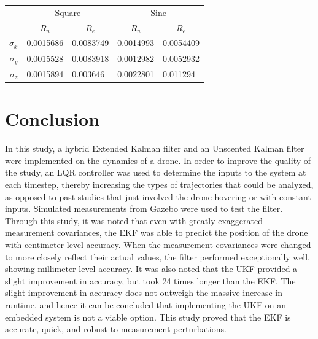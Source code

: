 \documentclass[letterpaper, paper,11pt]{AAS}	%
\begin{document}
\begin{table}[H]
\centering
\begin{tabular}{|r|ll|ll|}
\hline
\multirow{2}{*}{\ } & \multicolumn{2}{c|}{Square} & \multicolumn{2}{c|}{Sine} \\ \cline{2-5} 
 & \multicolumn{1}{c|}{$R_{a}$} & \multicolumn{1}{c|}{$R_{e}$} & \multicolumn{1}{c|}{$R_{a}$} & \multicolumn{1}{c|}{$R_{e}$} \\ \hline
$\sigma_x$ & \multicolumn{1}{l|}{0.0015686} & 0.0083749 & \multicolumn{1}{l|}{0.0014993} & 0.0054409 \\ \hline
$\sigma_y$ & \multicolumn{1}{l|}{0.0015528} & 0.0083918 & \multicolumn{1}{l|}{0.0012982} & 0.0052932 \\ \hline
$\sigma_z$ & \multicolumn{1}{l|}{0.0015894} & 0.003646 & \multicolumn{1}{l|}{0.0022801} & 0.011294 \\ \hline
\end{tabular}
\end{table}

\section{Conclusion}

In this study, a hybrid Extended Kalman filter and an Unscented Kalman filter were implemented on the dynamics of a drone. In order to improve the quality of the study, an LQR controller was used to determine the inputs to the system at each timestep, thereby increasing the types of trajectories that could be analyzed, as opposed to past studies that just involved the drone hovering or with constant inputs. Simulated measurements from Gazebo were used to test the filter. Through this study, it was noted that even with greatly exaggerated measurement covariances, the EKF was able to predict the position of the drone with centimeter-level accuracy. When the measurement covariances were changed to more closely reflect their actual values, the filter performed exceptionally well, showing millimeter-level accuracy. It was also noted that the UKF provided a slight improvement in accuracy, but took 24 times longer than the EKF. The slight improvement in accuracy does not outweigh the massive increase in runtime, and hence it can be concluded that implementing the UKF on an embedded system is not a viable option. This study proved that the EKF is accurate, quick, and robust to measurement perturbations.
\end{document}
